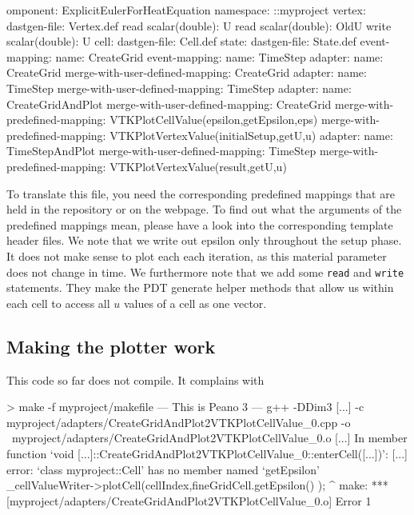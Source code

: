 \begin{code}
omponent: ExplicitEulerForHeatEquation
namespace: ::myproject
vertex:
  dastgen-file: Vertex.def
  read scalar(double): U
  read scalar(double): OldU
  write scalar(double): U
cell:
  dastgen-file: Cell.def
state:
  dastgen-file: State.def
event-mapping:
  name: CreateGrid
event-mapping:
  name: TimeStep
adapter:
  name: CreateGrid
  merge-with-user-defined-mapping: CreateGrid
adapter:
  name: TimeStep
  merge-with-user-defined-mapping: TimeStep
adapter:
  name: CreateGridAndPlot
  merge-with-user-defined-mapping: CreateGrid
  merge-with-predefined-mapping: VTKPlotCellValue(epsilon,getEpsilon,eps)
  merge-with-predefined-mapping: VTKPlotVertexValue(initialSetup,getU,u)
adapter:
  name: TimeStepAndPlot
  merge-with-user-defined-mapping: TimeStep
  merge-with-predefined-mapping: VTKPlotVertexValue(result,getU,u)
\end{code}

\noindent
To translate this file, you need the corresponding predefined mappings that are 
held in the repository or on the webpage.
To find out what the arguments of the predefined mappings mean, please have a 
look into the corresponding template header files.
We note that we write out epsilon only throughout the setup phase. 
It does not make sense to plot each each iteration, as this material parameter
does not change in time.
We furthermore note that we add some \texttt{read} and \texttt{write}
statements.
They make the PDT generate helper methods that allow us within each cell to
access all $u$ values of a cell as one vector.



\subsection{Making the plotter work}

This code so far does not compile. It complains with

\begin{code}
> make -f myproject/makefile
--- This is Peano 3 ---
g++ -DDim3 [...] -c myproject/adapters/CreateGridAndPlot2VTKPlotCellValue_0.cpp -o \
myproject/adapters/CreateGridAndPlot2VTKPlotCellValue_0.o 
[...]  In member function ‘void [...]::CreateGridAndPlot2VTKPlotCellValue_0::enterCell([...])’:
[...] error: ‘class myproject::Cell’ has no member named ‘getEpsilon’
     _cellValueWriter->plotCell(cellIndex,fineGridCell.getEpsilon() );
                                                       ^
make: *** [myproject/adapters/CreateGridAndPlot2VTKPlotCellValue_0.o] Error 1
\end{code}

